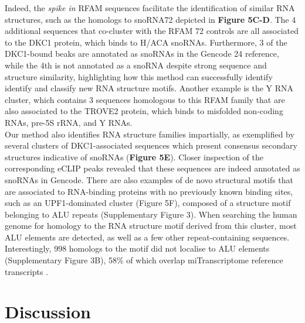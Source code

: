 \documentclass{bmcart}
\begin{document}
Indeed, the \textit{spike in} RFAM sequences facilitate the identification of similar RNA structures, 
such as the homologs to snoRNA72 depicted in \textbf{Figure 5C-D}. The 4 additional sequences that 
co-cluster with the RFAM 72 controls are all associated to the DKC1 protein, which binds to H/ACA snoRNAs. 
Furthermore, 3 of the DKC1-bound beaks are annotated as snoRNAs in the Gencode 24 reference, 
while the 4th is not annotated as a snoRNA despite strong sequence and structure similarity, 
highlighting how this method can successfully identify identify and classify new RNA structure motifs. 
Another example is the Y RNA cluster, which contains 3 sequences homologous to this RFAM family 
that are also associated to the TROVE2 protein, which binds to misfolded non-coding RNAs, 
pre-5S rRNA, and Y RNAs.\\

Our method also identifies RNA structure families impartially, 
as exemplified by several clusters of DKC1-associated sequences which present
consensus secondary structures indicative of snoRNAs (\textbf{Figure 5E}). 
Closer inspection of the corresponding eCLIP peaks revealed that these sequences
are indeed annotated as snoRNAs in Gencode. There are also examples of de novo 
structural motifs that are associated to RNA-binding proteins with no 
previously known binding sites, such as an UPF1-dominated cluster 
(Figure 5F), composed of a structure motif belonging to ALU repeats 
(Supplementary Figure 3). When searching the human genome for 
homology to the RNA structure motif derived from this cluster, 
most ALU elements are detected, as well as a few other repeat-containing sequences. 
Interestingly, 998 homologs to the motif did not localise to ALU elements (Supplementary Figure 3B), 
58\% of which overlap miTranscriptome reference transcripts \cite{iyer2015landscape}. 


\section*{Discussion}
\end{document}
